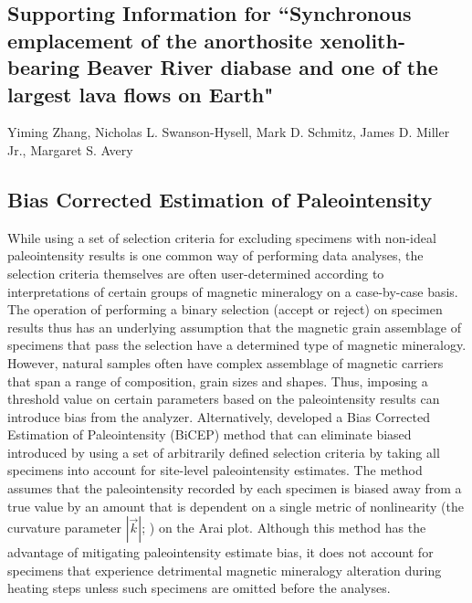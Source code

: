 \documentclass[11pt,letterpaper]{article}
\begin{document}
\renewcommand{\thefigure}{S\arabic{figure}}
\renewcommand{\thetable}{S\arabic{table}}
\subsection*{Supporting Information for ``Synchronous emplacement of the anorthosite xenolith-bearing Beaver River diabase and one of the largest lava flows on Earth"}
Yiming Zhang, Nicholas L. Swanson-Hysell, Mark D. Schmitz, James D. Miller Jr., Margaret S. Avery

\subsection*{Bias Corrected Estimation of Paleointensity}
While using a set of selection criteria for excluding specimens with non-ideal paleointensity results is one common way of performing data analyses, the selection criteria themselves are often user-determined according to interpretations of certain groups of magnetic mineralogy on a case-by-case basis. The operation of performing a binary selection (accept or reject) on specimen results thus has an underlying assumption that the magnetic grain assemblage of specimens that pass the selection have a determined type of magnetic mineralogy. However, natural samples often have complex assemblage of magnetic carriers that span a range of composition, grain sizes and shapes. Thus, imposing a threshold value on certain parameters based on the paleointensity results can introduce bias from the analyzer. Alternatively,  developed a Bias Corrected Estimation of Paleointensity (BiCEP) method that can eliminate biased introduced by using a set of arbitrarily defined selection criteria by taking all specimens into account for site-level paleointensity estimates. The method assumes that the paleointensity recorded by each specimen is biased away from a true value by an amount that is dependent on a single metric of nonlinearity (the curvature parameter $|\vec{k}|$; ) on the Arai plot. Although this method has the advantage of mitigating paleointensity estimate bias, it does not account for specimens that experience detrimental magnetic mineralogy alteration during heating steps unless such specimens are omitted before the analyses. 
\end{document}
